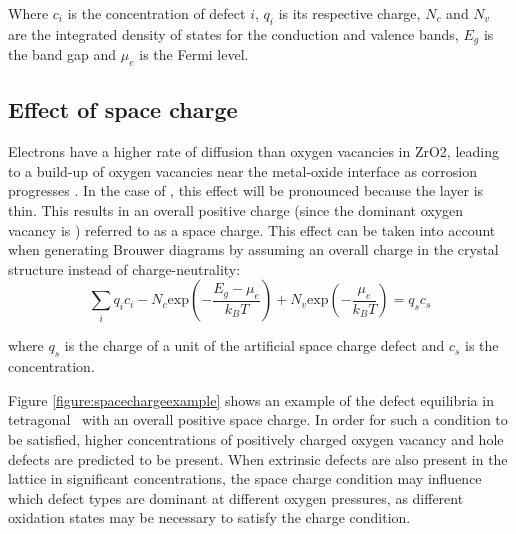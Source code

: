 Where $c_{i}$ is the concentration of defect $i$, $q_{i}$ is its respective charge, $N_{c}$ and $N_{v}$ are the integrated density of states for the conduction and valence bands, $E_{g}$ is the band gap and $\mu_{e}$ is the Fermi level. 

\subsection{Effect of space charge} \label{space_charge}

Electrons have a higher rate of diffusion than oxygen vacancies in ZrO2, leading to a build-up of oxygen vacancies near the metal-oxide interface as corrosion progresses \cite{bojinov2010influence}. In the case of \zirconia , this effect will be pronounced because the layer is thin. This results in an overall positive charge (since the dominant oxygen vacancy is ) referred to as a space charge. This effect can be taken into account when generating Brouwer diagrams by assuming an overall charge in the crystal structure instead of charge-neutrality:
\begin{equation}
\sum_{i}q_{i}c_{i} - N_{c}\textrm{exp}{(-\frac{E_{g}-\mu_{e}}{k_{B}T})} + N_{v}\textrm{exp}{(-\frac{\mu_{e}}{k_{B}T})} = q_{s}c_{s}
\label{charge_non_neutrality}
\end{equation}

where $q_{s}$ is the charge of a unit of the artificial space charge defect and $c_{s}$ is the concentration.

Figure \ref{figure:spacechargeexample} shows an example of the defect equilibria in tetragonal \zirconia\ with an overall positive space charge. In order for such a condition to be satisfied, higher concentrations of positively charged oxygen vacancy and hole defects are predicted to be present. When extrinsic defects are also present in the lattice in significant concentrations, the space charge condition may influence which defect types are dominant at different oxygen pressures, as different oxidation states may be necessary to satisfy the charge condition.



